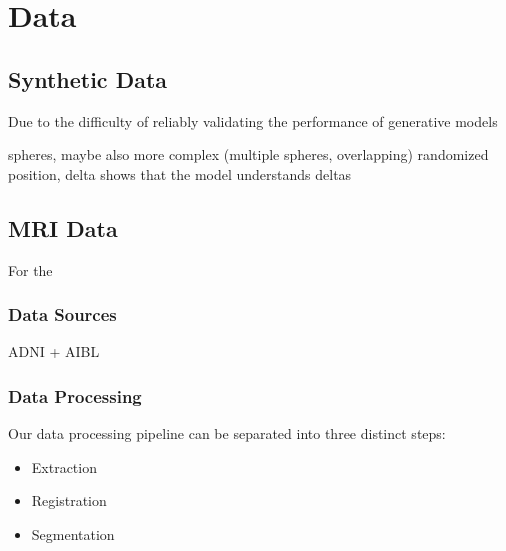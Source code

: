 \chapter{Data}

\section{Synthetic Data}
Due to the difficulty of reliably validating the performance of generative models

spheres, maybe also more complex (multiple spheres, overlapping)
randomized position, delta
shows that the model understands deltas

\section{MRI Data}
For the 

\subsection{Data Sources}

ADNI + AIBL

\subsection{Data Processing}
Our data processing pipeline can be separated into three distinct steps:

\begin{itemize}
\item Extraction
\item Registration
\item Segmentation
\end{itemize}

